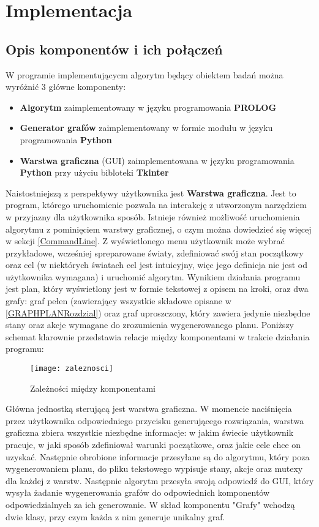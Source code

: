 \chapter{Implementacja}
\thispagestyle{chapterBeginStyle}

\section{Opis komponentów i ich połączeń}
    W programie implementującycm algorytm będący obiektem badań można wyróżnić 3 główne komponenty:
    \begin{itemize}
        \item \textbf{Algorytm} zaimplementowany w języku programowania \textbf{PROLOG}
        \item \textbf{Generator grafów} zaimplementowany w formie modułu w języku programowania \textbf{Python}
        \item \textbf{Warstwa graficzna} (GUI) zaimplementowana w języku programowania \textbf{Python} przy użyciu bibloteki \textbf{Tkinter}
    \end{itemize}
    Naistostniejszą z perspektywy użytkownika jest \textbf{Warstwa graficzna}. Jest to program, którego uruchomienie pozwala na 
    interakcję z utworzonym narzędziem w przyjazny dla użytkownika sposób. Istnieje również możliwość uruchomienia algorytmu z pominięciem 
    warstwy graficznej, o czym można dowiedzieć się więcej w sekcji \ref{CommandLine}.
    Z wyświetlonego menu użytkownik może wybrać przykładowe, wcześniej spreparowane światy, zdefiniować swój stan początkowy oraz cel (w niektórych 
    światach cel jest intuicyjny, więc jego definicja nie jest od użytkownika wymagana) i uruchomić algorytm. Wynikiem działania programu jest 
    plan, który wyświetlony jest w formie tekstowej z opisem na kroki, oraz dwa grafy: graf pełen (zawierający wszystkie składowe opisane 
    w \ref{GRAPHPLANRozdzial}) oraz graf uproszczony, który zawiera jedynie niezbędne stany oraz akcje wymagane do zrozumienia wygenerowanego planu.
    Poniższy schemat klarownie przedstawia relacje między komponentami w trakcie działania programu:
    \begin{figure}[H]
        \texttt{[image: zaleznosci]}
        \centering
        \caption{Zależności między komponentami}
    \end{figure}
    Główna jednostką sterującą jest warstwa graficzna. W momencie naciśnięcia przez użytkownika odpowiedniego przycisku generującego rozwiązania, warstwa 
    graficzna zbiera wszystkie niezbędne informacje: w jakim świecie użytkownik pracuje, w jaki sposób zdefiniował warunki początkowe, oraz jakie cele 
    chce on uzyskać. Następnie obrobione informacje przesyłane są do algorytmu, który poza wygenerowaniem planu, do pliku tekstowego wypisuje 
    stany, akcje oraz mutexy dla każdej z warstw. Następnie algorytm przesyła swoją odpowiedź do GUI, 
    który wysyła żadanie wygenerowania grafów do odpowiednich komponentów odpowiedzialnych za ich 
    generowanie. W skład komponentu "Grafy" wchodzą dwie klasy, przy czym każda z nim generuje unikalny graf.

